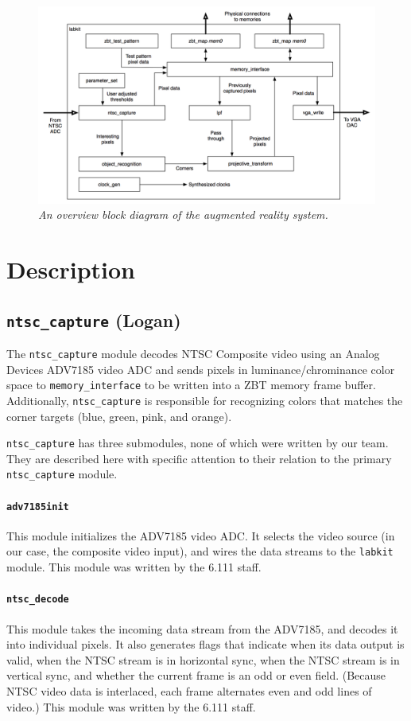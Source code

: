 \documentclass[10pt]{article}
\begin{document}
\begin{figure}[h!]
\centering
\includegraphics[width=\textwidth]{images/simplified_block_diagram.png}
\caption{\emph{An overview block diagram of the augmented reality system.}}
\end{figure}

\section{Description}

\subsection{{\tt ntsc\_capture} (Logan)}
The {\tt ntsc\_capture} module decodes NTSC Composite video using an Analog Devices ADV7185 video ADC and sends pixels in luminance/chrominance color space to {\tt memory\_interface} to be written into a ZBT memory frame buffer. Additionally, {\tt ntsc\_capture} is responsible for recognizing colors that matches the corner targets (blue, green, pink, and orange).

{\tt ntsc\_capture} has three submodules, none of which were written by our team. They are described here with specific attention to their relation to the primary {\tt ntsc\_capture} module.

\paragraph{{\tt adv7185init}} This module initializes the ADV7185 video ADC. It selects the video source (in our case, the composite video input), and wires the data streams to the {\tt labkit} module. This module was written by the 6.111 staff.

\paragraph{{\tt ntsc\_decode}} This module takes the incoming data stream from the ADV7185, and decodes it into individual pixels. It also generates flags that indicate when its data output is valid, when the NTSC stream is in horizontal sync, when the NTSC stream is in vertical sync, and whether the current frame is an odd or even field. (Because NTSC video data is interlaced, each frame alternates even and odd lines of video.) This module was written by the 6.111 staff.
\end{document}
